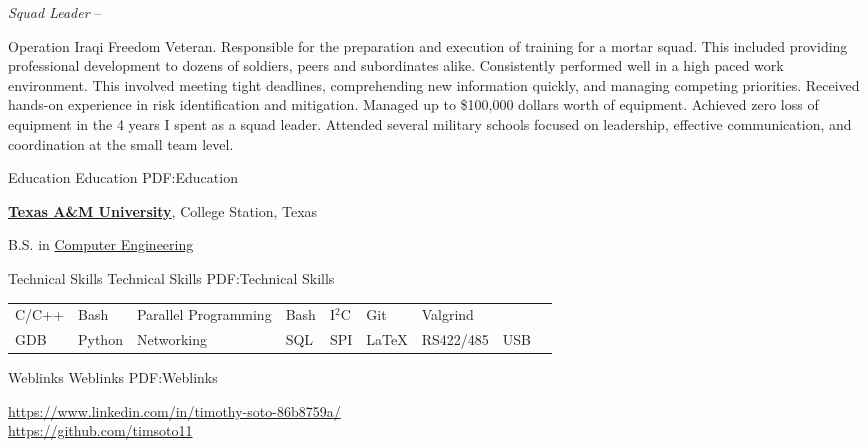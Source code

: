 \documentclass[letterpaper,MMMyyyy,nonstopmode]{simpleresumecv}
\begin{document}
\begin{Body}
        {\textit{Squad Leader}}
    \hfill
     --
    \begin{Detail}
        \BulletItem
        Operation Iraqi Freedom Veteran.
        \vspace{1mm} %
        \BulletItem
        Responsible for the preparation and execution of training for a mortar squad. This included providing professional development to dozens of soldiers, peers and subordinates alike.
        \vspace{1mm} %
        \BulletItem
        Consistently performed well in a high paced work environment. This involved meeting tight deadlines, comprehending new information quickly, and managing competing priorities.
        \vspace{1mm} %
        \BulletItem
        Received hands-on experience in risk identification and mitigation.
        \vspace{1mm} %
        \BulletItem
        Managed up to \$100,000 dollars worth of equipment. Achieved zero loss of equipment in the 4 years I spent as a squad leader.
        \vspace{1mm} %
        \BulletItem
        Attended several military schools focused on leadership, effective communication, and coordination at the small team level.
    \end{Detail}
    \BigGap

    \Section
    {Education}
    {Education}
    {PDF:Education}

    \Entry
    \href{http://www.tamu.edu}
    {\textbf{Texas A\&M University}},
    College Station, Texas

    B.S. in
    \href{https://engineering.tamu.edu/cse/index.html}
    {Computer Engineering}
    \hfill


    \Section
    {Technical Skills}
    {Technical Skills}
    {PDF:Technical Skills}

    \noindent\begin{tabular}[t]{@{}lllllllll}
        C/C++ & Bash   & Parallel Programming & Bash & I$^{2}$C & Git      & Valgrind        \\
        GDB   & Python & Networking           & SQL  & SPI      & {\LaTeX} & RS422/485 & USB
    \end{tabular}


    \Section
    {Weblinks}
    {Weblinks}
    {PDF:Weblinks}

    \href{https://www.linkedin.com/in/timothy-soto-86b8759a/}
    {https://www.linkedin.com/in/timothy-soto-86b8759a/} \\
    \href{https://github.com/timsoto11}
    {https://github.com/timsoto11}
\end{Body}
\end{document}
